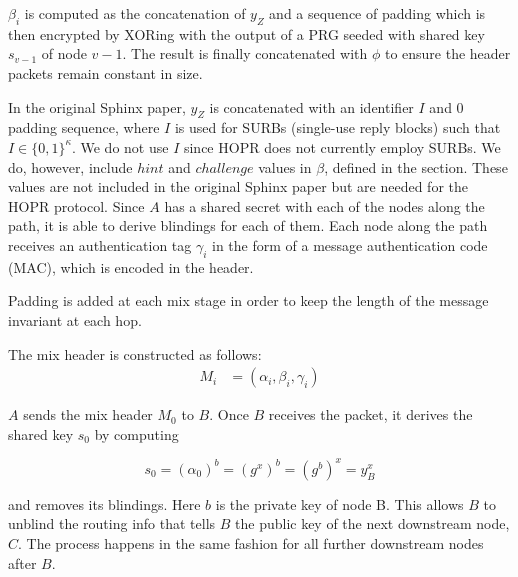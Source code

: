 $\beta_i$ is computed as the concatenation of $y_Z$ and a sequence of padding which is then encrypted by XORing with the output of a PRG seeded with shared key $s_{v-1}$ of node $v-1$. The result is finally concatenated with $\phi$ to ensure the header packets remain constant in size.

In the original Sphinx paper, $y_Z$ is concatenated with an identifier $I$ and $0$ padding sequence, where $I$ is used for SURBs (single-use reply blocks) such that $I \in \{0, 1\}^\kappa$. We do not use $I$ since HOPR does not currently employ SURBs. We do, however, include $hint$ and $challenge$ values in $\beta$, defined in the  section. These values are not included in the original Sphinx paper but are needed for the HOPR protocol. Since $A$ has a shared secret with each of the nodes along the path, it is able to derive blindings for each of them. Each node along the path receives an authentication tag $\gamma_i$ in the form of a message authentication code (MAC), which is encoded in the header.

Padding is added at each mix stage in order to keep the length of the message invariant at each hop.

The mix header is constructed as follows:
\begin{align}
    M_i & =(\alpha_i,\beta_i,\gamma_i)
\end{align}

$A$ sends the mix header $M_0$ to $B$. Once $B$ receives the packet, it derives the shared key $s_0$ by computing

$$s_0=(\alpha_0)^b=(g^x)^b=(g^b)^x=y^x_B$$

and removes its blindings. Here $b$ is the private key of node B. This allows $B$ to unblind the routing info that tells $B$ the public key of the next downstream node, $C$. The process happens in the same fashion for all further downstream nodes after $B$.

